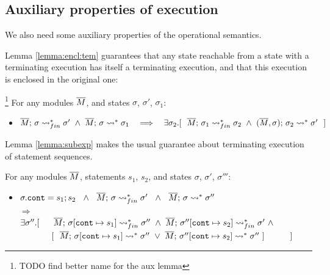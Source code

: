  
\subsection{Auxiliary properties of  execution} 
\label{sect:termExecs}
We also need some auxiliary properties of the operational semantics.
 
Lemma \ref{lemma:encl:tem} guarantees that any state reachable from a state with a terminating execution has itself a terminating execution, and that this execution is enclosed in the original one:
 
 \begin{auxLemma}\footnote{TODO find better name for the aux lemma}
 \label{lemma:encl:tem}
 For any modules $\overline{M}$,   and states $\sigma$, $\sigma'$, $\sigma_1$:
\begin{itemize}
\item
$  \leadstoBoundedStarFin {\Mtwo}  {\sigma}  {\sigma'} \  \wedge \  \leadstoBoundedStar  {\Mtwo}  {\sigma}  {\sigma_1} 
\ \ \  \Longrightarrow\ \ \  %
 \exists \sigma_2.[\ \ \leadstoBoundedStarFin {\Mtwo} {\sigma_1}  {\sigma_2}  
\ \wedge\ 
\leadstoBoundedStarThree  {\Mtwo}  {\sigma_2}  {\sigma}   {\sigma'} \ \ ]$
\end{itemize}

\end{auxLemma} 
 
Lemma \ref{lemma:subexp} makes the usual guarantee about terminating execution of statement sequences.
  
\begin{auxLemma}
\label{lemma:subexp}
For any modules $\overline{M}$, statements $s_1$, $s_2$, and states $\sigma$, $\sigma'$, $\sigma'''$:
\begin{itemize}
\item
$ \sigma.\texttt{cont} = s_1; s_2 \ \ \wedge\ \  \leadstoBoundedStarFin {\Mtwo}  {\sigma}  {\sigma'}\ \ 
\wedge \ \
\leadstoBoundedStar {\Mtwo}  {\sigma}  {\sigma''}\
$\\
$  \Longrightarrow$\\
$   \exists \sigma''.[\ \ \ \ \   \leadstoBoundedStarFin {\Mtwo} {\sigma[\texttt{cont}\mapsto s_1]}  {\sigma''}  
\ \wedge\ 
\leadstoBoundedStarFin {\Mtwo} {\sigma''[\texttt{cont}\mapsto s_2]}   {\sigma'} \  \wedge$
\\
$\strut \hspace{1.3cm}  [ \ \ \overline{M};\, {\sigma[\texttt{cont}\mapsto s_1]} \rightsquigarrow^* \sigma''\ \vee \ \overline{M};\, {\sigma''[\texttt{cont}\mapsto s_2]} \rightsquigarrow^* \sigma''\ ]\ \ \ \ \ \ \ \  \ ] $
\end{itemize}
\end{auxLemma}
 

